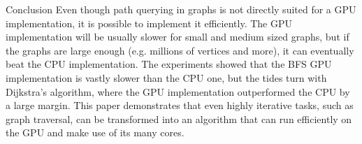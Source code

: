 \documentclass[a4paper,12pt,notitlepage,oneside]{article}
\begin{document}
\begin{section}{Conclusion}
Even though path querying in graphs is not directly suited for a GPU implementation, it is possible to implement it efficiently. The GPU implementation
will be usually slower for small and medium sized graphs, but if the graphs are large enough (e.g. millions of vertices and more), it can eventually beat the
CPU implementation. The experiments showed that the BFS GPU implementation is vastly slower than the CPU one, but the tides turn with Dijkstra's algorithm,
where the GPU implementation outperformed the CPU by a large margin.
This paper demonstrates that even highly iterative tasks, such as graph traversal, can be transformed into an algorithm that can
run efficiently on the GPU and make use of its many cores.
\end{section}

\clearpage

\printbibliography
\end{document}
